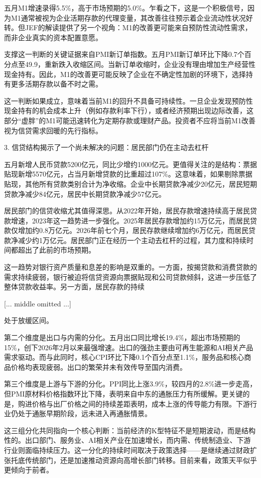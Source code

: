 \documentclass[11pt]{ctexart}
\begin{document}
五月M1增速录得5.5\%，高于市场预期的5.0\%。乍看之下，这是一个积极信号，因为M1通常被视为企业活期存款的代理变量，其改善往往预示着企业流动性状况好转。但JEF的解读提供了另一个视角：M1的改善更可能来自预防性流动性需求，而非企业真实的资本配置意愿。

支撑这一判断的关键证据来自PMI新订单指数。五月PMI新订单环比下降0.7个百分点至49.9，重新跌入收缩区间。当新订单收缩时，企业没有理由增加生产经营性现金持有。因此，M1的改善更可能反映了企业在不确定性加剧的环境下，选择持有更多活期存款以备不时之需。

这一判断如果成立，意味着当前M1的回升不具备可持续性。一旦企业发现预防性现金持有的机会成本上升（例如存款利率下行），或者经济预期出现边际改善，这部分“虚胖”的M1可能迅速转化为定期存款或理财产品。投资者不应将当前M1改善视为信贷需求回暖的先行指标。

3. 信贷结构揭示了一个尚未解决的问题：居民部门仍在主动去杠杆

五月新增人民币贷款5200亿元，同比少增约1000亿元。更值得关注的是结构：票据贴现新增5570亿元，占当月新增贷款的比重超过107\%。这意味着，如果剔除票据贴现，其他所有贷款类别合计为净收缩。企业中长期贷款净减少20亿元，居民短期贷款净减少84亿元，居民中长期贷款净减少57亿元。

居民部门的信贷收缩尤其值得深思。从2022年开始，居民存款增速持续高于居民贷款增速，2023年这一趋势进一步强化。2025年居民存款增加约15万亿元，而居民贷款仅增加约0.8万亿元。2026年前七个月，居民存款继续增加约6万亿元，而居民贷款净减少约1万亿元。居民部门正在经历一个主动去杠杆的过程，其力度和持续时间都超出了此前的市场预期。

这一趋势对银行资产质量和息差的影响是双重的。一方面，按揭贷款和消费贷款的需求持续疲弱，银行被迫将信贷资源向票据贴现和公司贷款倾斜，这进一步压低了整体贷款收益率。另一方面，居民存款的持续

[... middle omitted ...]

处于放缓区间。

第二个维度是出口与内需的分化。五月出口同比增长19.4\%，超出市场预期的15\%，创下2026年2月以来最强增速。出口的强劲主要由可再生能源和AI相关产品需求驱动。而与此同时，核心CPI环比下降0.1个百分点至1.1\%，服务品和核心商品价格均表现疲弱。出口的繁荣并未有效传导至国内消费。

第三个维度是上游与下游的分化。PPI同比上涨3.9\%，较四月的2.8\%进一步走高，但PMI原材料价格指数环比下降，表明来自中东的通胀压力有所缓解。更关键的是，购进价格与出厂价格之间的持续差距表明，成本上涨的传导能力有限。下游行业仍处于通胀早期阶段，远未进入再通胀情景。

这三组分化共同指向一个核心判断：当前经济的K型特征不是短期波动，而是结构性的。出口部门、服务业、AI相关产业在加速增长，而内需、传统制造业、下游行业则面临持续压力。这一分化的持续时间取决于政策选择——是继续通过财政扩张托底传统部门，还是加速推动资源向高增长部门转移。目前来看，政策天平似乎更倾向于前者。
\end{document}
